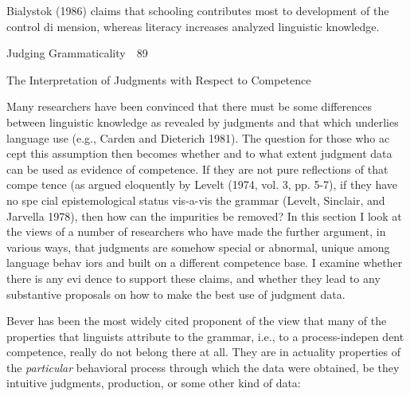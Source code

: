 \begin{listWWNumxlvleveli}
\item 
\begin{styleStandard}
Bialystok (1986) claims that schooling contributes most to development of the control di\- mension, whereas literacy increases analyzed linguistic knowledge.
\end{styleStandard}


\end{listWWNumxlvleveli}
\clearpage\setcounter{page}{1}\begin{styleStandard}
Judging Grammaticality\ \ 89
\end{styleStandard}


\setcounter{listWWNumxlvileveli}{2}
\begin{listWWNumxlvileveli}
\item 
\setcounter{listWWNumxlvilevelii}{3}
\begin{listWWNumxlvilevelii}
\item 
\begin{styleTextbody}
The Interpretation of Judgments with Respect to Competence
\end{styleTextbody}


\end{listWWNumxlvilevelii}
\end{listWWNumxlvileveli}
\begin{styleTextbody}
Many researchers have been convinced that there must be some differences between linguistic knowledge as revealed by judgments and that which underlies language use (e.g., Carden and Dieterich 1981). The question for those who ac\- cept this assumption then becomes whether and to what extent judgment data can be used as evidence of competence. If they are not pure reflections of that compe\- tence (as argued eloquently by Levelt (1974, vol. 3, pp. 5-7), if they have no spe\- cial epistemological status vis-a-vis the grammar (Levelt, Sinclair, and Jarvella 1978), then how can the impurities be removed? In this section I look at the views of a number of researchers who have made the further argument, in various ways, that judgments are somehow special or abnormal, unique among language behav\- iors and built on a different competence base. I examine whether there is any evi\- dence to support these claims, and whether they lead to any substantive proposals on how to make the best use of judgment data.
\end{styleTextbody}


\begin{styleTextbody}
Bever has been the most widely cited proponent of the view that many of the properties that linguists attribute to the grammar, i.e., to a process-indepen\- dent competence, really do not belong there at all. They are in actuality properties of the \textit{particular}\textit{ }behavioral process through which the data were obtained, be they intuitive judgments, production, or some other kind of data:
\end{styleTextbody}


